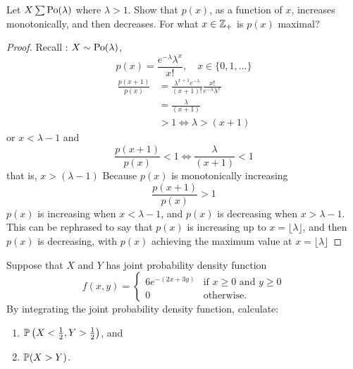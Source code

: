 \documentclass[10pt, a4paper]{article}
\begin{document}
\begin{problem}[100]
    Let $X \sum \Po(\lambda)$ where $\lambda > 1$.
    Show that $p(x)$,
    as a function of $x$,
    increases monotonically,
    and then decreases.
    For what $x \in \Z_+$ is $p(x)$ maximal?
    \begin{proof}
        Recall : $X \sim \Po(\lambda)$,
        \[
        p(x) = \frac{e ^ {-\lambda}\lambda ^ x}{x!},\quad x \in \{0, 1, \dotsc\}
        \]
        \begin{align*}
            \frac{p(x + 1)}{p(x)} &= \frac{\lambda ^ {x + 1} e ^ {-\lambda}}{(x + 1)!} \frac{x!}{e ^ {-\lambda} \lambda ^ x} \\
            &= \frac{\lambda}{(x + 1)} \\
            &> 1 \iff \lambda > (x + 1)
        \end{align*}
        or $x < \lambda - 1$ and
        \[
        \frac{p(x + 1)}{p(x)} < 1 \iff \frac{\lambda}{(x + 1)} < 1
        \]
        that is,
        $x > (\lambda - 1)$
        Because $p(x)$ is monotonically increasing
        \[
        \frac{p(x + 1)}{p(x)} > 1
        \]
        $p(x)$ is increasing when $x < \lambda - 1$,
        and $p(x)$ is decreasing when $x > \lambda - 1$.
        This can be rephrased to say that $p(x)$ is increasing up to $x = \lfloor\lambda\rfloor$,
        and then $p(x)$ is decreasing,
        with $p(x)$ achieving the maximum value at $x = \lfloor\lambda\rfloor$
    \end{proof}
\end{problem}

\begin{problem}[125]
    Suppose that $X$ and $Y$ has joint probability density function
    \[
    f(x, y) = \begin{cases}
        6e ^ {-(2x + 3y)} & \text{if } x \geq 0 \text{ and } y \geq 0 \\
        0 & \text{otherwise}.
    \end{cases}
    \]
    By integrating the joint probability density function,
    calculate:
    \begin{enumerate}[label = (\roman*)]
        \item $\P\left(X < \frac{1}{2}, Y > \frac{1}{2}\right)$, and
        \item $\P(X > Y)$.
    \end{enumerate}
\end{problem}
\end{document}
